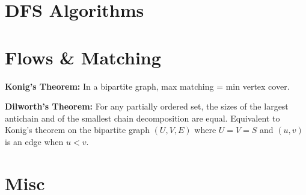 \section{DFS Algorithms}

\section{Flows \& Matching}

	\textbf{Konig's Theorem:} In a bipartite graph, max matching = min vertex cover.

	\textbf{Dilworth's Theorem:} For any partially ordered set, the sizes of the largest antichain and of the smallest chain decomposition are equal. Equivalent to Konig's theorem on the bipartite graph $(U,V,E)$ where $U=V=S$ and $(u,v)$ is an edge when $u<v.$ %


\section{Misc}
